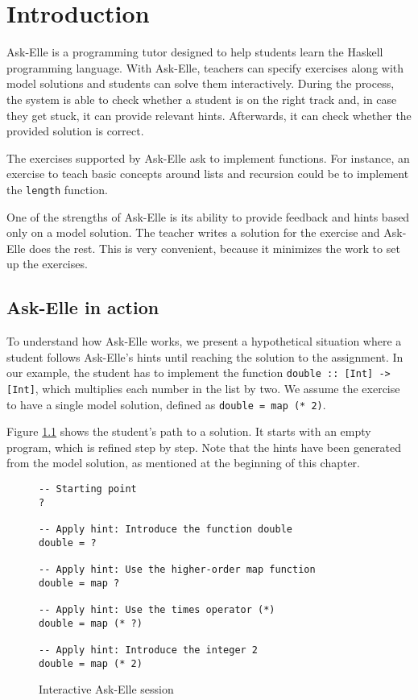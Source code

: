 \chapter{Introduction}

Ask-Elle \cite{2017askelle} is a programming tutor designed to help students learn the Haskell programming language. With Ask-Elle, teachers can specify exercises along with model solutions and students can solve them interactively. During the process, the system is able to check whether a student is on the right track and, in case they get stuck, it can provide relevant hints. Afterwards, it can check whether the provided solution is correct.

The exercises supported by Ask-Elle ask to implement functions. For instance, an exercise to teach basic concepts around lists and recursion could be to implement the \texttt{length} function.

One of the strengths of Ask-Elle is its ability to provide feedback and hints based only on a model solution. The teacher writes a solution for the exercise and Ask-Elle does the rest. This is very convenient, because it minimizes the work to set up the exercises.

\section{Ask-Elle in action}
\label{sec:intro-askelle-example-session}

To understand how Ask-Elle works, we present a hypothetical situation where a student follows Ask-Elle's hints until reaching the solution to the assignment. In our example, the student has to implement the function \texttt{double :: [Int] -> [Int]}, which multiplies each number in the list by two. We assume the exercise to have a single model solution, defined as \texttt{double = map (* 2)}.

Figure \ref{fig:interactive-session-double} shows the student's path to a solution. It starts with an empty program, which is refined step by step. Note that the hints have been generated from the model solution, as mentioned at the beginning of this chapter.

\begin{figure}
\begin{verbatim}
-- Starting point
?

-- Apply hint: Introduce the function double
double = ?

-- Apply hint: Use the higher-order map function
double = map ?

-- Apply hint: Use the times operator (*)
double = map (* ?)

-- Apply hint: Introduce the integer 2
double = map (* 2)
\end{verbatim}
\caption{Interactive Ask-Elle session}
\label{fig:interactive-session-double}
\end{figure}

